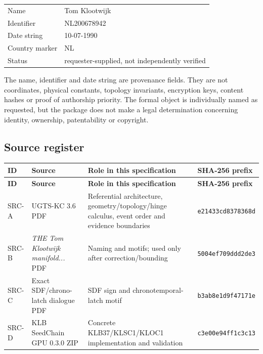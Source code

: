 \documentclass[10pt,a4paper]{article}
\begin{document}
\begin{center}
\begin{tabular}{@{}ll@{}}
\toprule
Name & Tom Klootwijk \\
Identifier & NL200678942 \\
Date string & 10-07-1990 \\
Country marker & NL \\
Status & requester-supplied, not independently verified \\
\bottomrule
\end{tabular}
\end{center}

\begin{boundarybox}
The name, identifier and date string are provenance fields. They are not coordinates, physical constants, topology invariants, encryption keys, content hashes or proof of authorship priority. The formal object is individually named as requested, but the package does not make a legal determination concerning identity, ownership, patentability or copyright.
\end{boundarybox}

\subsection{Source register}

\begin{longtable}{@{}L{12mm}L{48mm}L{59mm}L{35mm}@{}}
\toprule
\textbf{ID} & \textbf{Source} & \textbf{Role in this specification} & \textbf{SHA-256 prefix} \\
\midrule
\endfirsthead
\toprule
\textbf{ID} & \textbf{Source} & \textbf{Role in this specification} & \textbf{SHA-256 prefix} \\
\midrule
\endhead
SRC-A & UGTS-KC 3.6 PDF & Referential architecture, geometry/topology/hinge calculus, event order and evidence boundaries & \texttt{e21433cd8378368d} \\
SRC-B & \emph{THE Tom Klootwijk manifold...} PDF & Naming and motifs; used only after correction/bounding & \texttt{5004ef709ddd2de3} \\
SRC-C & Exact SDF/chrono-latch dialogue PDF & SDF sign and chronotemporal-latch motif & \texttt{b3ab8e1d9f47171e} \\
SRC-D & KLB SeedChain GPU 0.3.0 ZIP & Concrete KLB37/KLSC1/KLOC1 implementation and validation & \texttt{c3e00e94ff1c3c13} \\
\bottomrule
\end{longtable}
\end{document}
